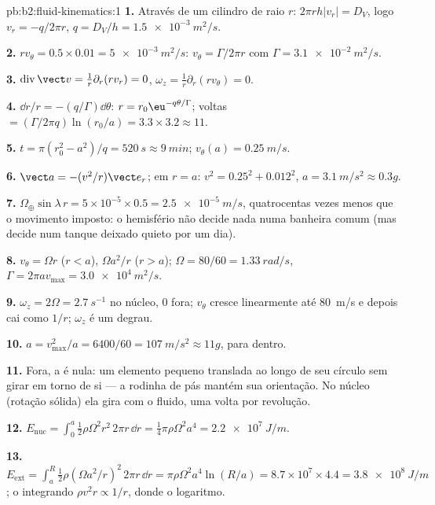 \begin{solution}{pb:b2:fluid-kinematics:1}
\textbf{1.} Através de um cilindro de raio $r$: $2\pi rh|v_r| = D_V$, logo
$v_r = -q/2\pi r$, $q = D_V/h = \qty{1.5e-3}{m^2/s}$.

\textbf{2.} $rv_\theta = 0.5 \times 0.01 = \qty{5e-3}{m^2/s}$: $v_\theta = \Gamma/2\pi r$
com $\Gamma = \qty{3.1e-2}{m^2/s}$.

\textbf{3.} $\operatorname{div}\vect v = \frac1r\partial_r(rv_r) = 0$, $\omega_z =
\frac1r\partial_r(rv_\theta) = 0$.

\textbf{4.} $\dd r/r = -(q/\Gamma)\dd\theta$: $r = r_0\eu^{-q\theta/\Gamma}$; voltas
$= (\Gamma/2\pi q)\ln(r_0/a) = 3.3 \times 3.2 \approx 11$.

\textbf{5.} $t = \pi(r_0^2 - a^2)/q = \qty{520}{s} \approx \qty{9}{min}$; $v_\theta(a) =
\qty{0.25}{m/s}$.

\textbf{6.} $\vect a = -(v^2/r)\vect e_r$; em $r = a$: $v^2 = 0.25^2 + 0.012^2$,
$a = \qty{3.1}{m/s^2} \approx 0.3g$.

\textbf{7.} $\Omega_\oplus\sin\lambda\,r = 5 \times 10^{-5} \times 0.5 = \qty{2.5e-5}{m/s}$,
quatrocentas vezes menos que o movimento imposto: o hemisfério não decide
nada numa banheira comum (mas decide num tanque deixado quieto por um dia).

\textbf{8.} $v_\theta = \Omega r$ ($r < a$), $\Omega a^2/r$ ($r > a$); $\Omega = 80/60
= \qty{1.33}{rad/s}$, $\Gamma = 2\pi av_{\max} = \qty{3.0e4}{m^2/s}$.

\textbf{9.} $\omega_z = 2\Omega = \qty{2.7}{s^{-1}}$ no núcleo, $0$ fora;
$v_\theta$ cresce linearmente até \qty{80}{m/s} e depois cai como $1/r$; $\omega_z$ é um
degrau.

\textbf{10.} $a = v_{\max}^2/a = 6400/60 = \qty{107}{m/s^2} \approx 11g$, para dentro.

\textbf{11.} Fora, a  é nula: um elemento pequeno translada
ao longo de seu círculo sem girar em torno de si --- a rodinha de pás
mantém sua orientação. No núcleo (rotação sólida) ela gira com o
fluido, uma volta por revolução.

\textbf{12.} $E_{\text{nuc}} = \int_0^a\tfrac12\rho\Omega^2r^2\,2\pi r\,\dd r =
\tfrac14\pi\rho\Omega^2a^4 = \qty{2.2e7}{J/m}$.

\textbf{13.} $E_{\text{ext}} = \int_a^R\tfrac12\rho(\Omega a^2/r)^2\,2\pi r\,\dd r =
\pi\rho\Omega^2a^4\ln(R/a) = 8.7 \times 10^7 \times 4.4 = \qty{3.8e8}{J/m}$; o
integrando $\rho v^2r \propto 1/r$, donde o logaritmo.


\end{solution}

